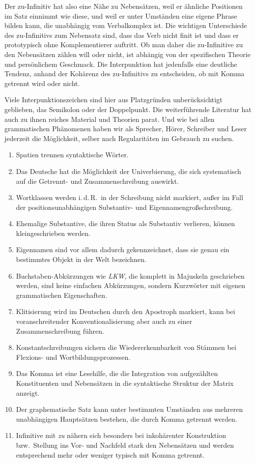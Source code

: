 Der zu-Infinitiv hat also eine Nähe zu Nebensätzen, weil er ähnliche Positionen im Satz einnimmt wie diese, und weil er unter Umständen eine eigene Phrase bilden kann, die unabhängig vom Verbalkomplex ist.
Die wichtigen Unterschiede des zu-Infinitivs zum Nebensatz sind, dass das Verb nicht finit ist und dass er prototypisch ohne Komplementierer auftritt.
Ob man daher die zu-Infinitive zu den Nebensätzen zählen will oder nicht, ist abhängig von der spezifischen Theorie und persönlichem Geschmack.
Die Interpunktion hat jedenfalls eine deutliche Tendenz, anhand der Kohärenz des zu-Infinitivs zu entscheiden, ob mit Komma getrennt wird oder nicht.

Viele Interpunktionszeichen sind hier aus Platzgründen unberücksichtigt geblieben, \zB das Semikolon oder der Doppelpunkt.
Die weiterführende Literatur hat auch zu ihnen reiches Material und Theorien parat.
Und wie bei allen grammatischen Phänomenen haben wir als Sprecher, Hörer, Schreiber und Leser jederzeit die Möglichkeit, selber nach Regularitäten im Gebrauch zu suchen.

\Zusammenfassung

\begin{enumerate}\Lf
  \item Spatien trennen syntaktische Wörter.
  \item Das Deutsche hat die Möglichkeit der Univerbierung, die sich systematisch auf die Getrennt- und Zusammenschreibung auswirkt.
  \item Wortklassen werden i.\,d.\,R.\ in der Schreibung nicht markiert, außer im Fall der positionsunabhängigen Substantiv- und Eigennamengroßschreibung.
  \item Ehemalige Substantive, die ihren Status als Substantiv verlieren, können kleingeschrieben werden.
  \item Eigennamen sind vor allem dadurch gekennzeichnet, dass sie genau ein bestimmtes Objekt in der Welt bezeichnen.
  \item Buchstaben-Abkürzungen wie \textit{LKW}, die komplett in Majuskeln geschrieben werden, sind keine einfachen Abkürzungen, sondern Kurzwörter mit eigenen grammatischen Eigenschaften. 
  \item Klitisierung wird im Deutschen durch den Apostroph markiert, kann bei voranschreitender Konventionalisierung aber auch zu einer Zusammenschreibung führen.
  \item Konstantschreibungen sichern die Wiedererkennbarkeit von Stämmen bei Flexions- und Wortbildungsprozessen.
  \item Das Komma ist eine Lesehilfe, die die Integration von aufgezählten Konstituenten und Nebensätzen in die syntaktische Struktur der Matrix anzeigt.
  \item Der graphematische Satz kann unter bestimmten Umständen aus mehreren unabhängigen Hauptsätzen bestehen, die durch Komma getrennt werden.
  \item Infinitive mit \textit{zu} nähern sich besonders bei inkohärenter Konstruktion bzw.\ Stellung ins Vor- und Nachfeld stark den Nebensätzen und werden entsprechend mehr oder weniger typisch mit Komma getrennt.
\end{enumerate}

